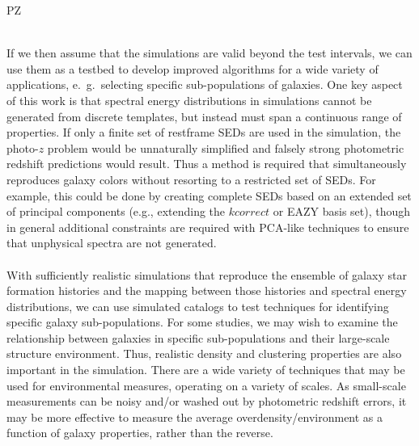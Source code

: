 {\begin{tasklist}{PZ}
\begin{task}
{~\\
If we then assume that the simulations are valid beyond the test intervals, we can use them as a testbed to develop improved algorithms for a wide variety of applications, e.~g.~selecting specific sub-populations of galaxies.  
One key aspect of this work is that spectral energy distributions in simulations cannot be generated from discrete templates, but instead must span a continuous range of properties. If only a finite set of restframe SEDs are used in the simulation, the photo-$z$ problem would be unnaturally simplified and  falsely strong photometric redshift predictions would result. Thus a method is required that simultaneously reproduces galaxy colors without resorting to a restricted set of SEDs. For example, this could be done by creating complete SEDs based  on an extended set of principal components (e.g., extending the $kcorrect$ or EAZY basis set), though in general additional constraints are required with PCA-like techniques to ensure that unphysical spectra are not generated.\\
~\\
With sufficiently realistic simulations that reproduce the ensemble of galaxy star formation histories and the mapping between those histories and spectral energy distributions, we can use simulated catalogs to test techniques for identifying specific galaxy sub-populations.  For some studies, we may wish to examine the relationship between galaxies in specific sub-populations and their large-scale structure environment.  Thus, realistic density and clustering properties are also important in the simulation.  There are a wide variety of techniques that may be used for environmental measures, operating on a variety of scales. As small-scale measurements can be noisy and/or washed out by photometric redshift errors, it may be more effective to measure the average overdensity/environment as a function of galaxy properties, rather than the reverse.
}
~\\
\end{task}
\end{tasklist}}
